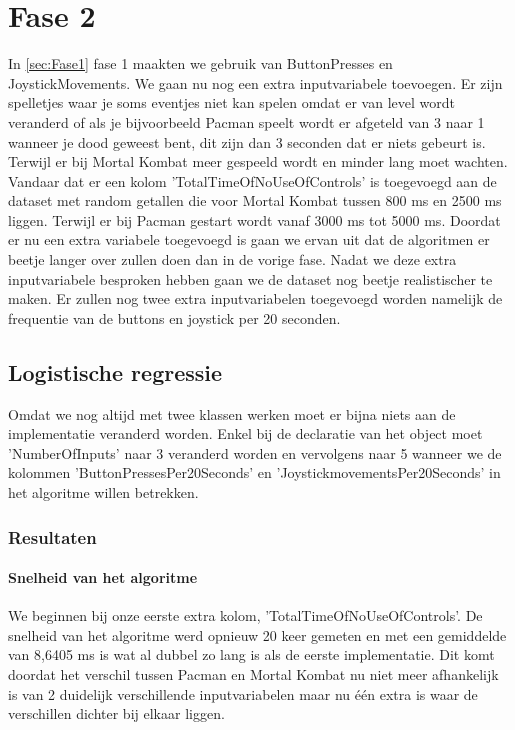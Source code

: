 
\newpage
\section{Fase 2}
\label{sec:Fase2}

In \ref{sec:Fase1} fase 1 maakten we gebruik van ButtonPresses en JoystickMovements. We gaan nu nog een extra inputvariabele toevoegen. Er zijn spelletjes waar je soms eventjes niet kan spelen omdat er van level wordt veranderd of als je bijvoorbeeld Pacman speelt wordt er afgeteld van 3 naar 1 wanneer je dood geweest bent, dit zijn dan 3 seconden dat er niets gebeurt is. Terwijl er bij Mortal Kombat meer gespeeld wordt en minder lang moet wachten.
Vandaar dat er een kolom 'TotalTimeOfNoUseOfControls' is toegevoegd aan de dataset met random getallen die voor Mortal Kombat tussen 800 ms en 2500 ms liggen. Terwijl er bij Pacman gestart wordt vanaf 3000 ms tot 5000 ms.
Doordat er nu een extra variabele toegevoegd is gaan we ervan uit dat de algoritmen er beetje langer over zullen doen dan in de vorige fase. Nadat we deze extra inputvariabele besproken hebben gaan we de dataset nog beetje realistischer te maken. Er zullen nog twee extra inputvariabelen toegevoegd worden namelijk de frequentie van de buttons en joystick per 20 seconden.  

\subsection{Logistische regressie}
\label{sec:Logistischeregressie-fase2}

Omdat we nog altijd met twee klassen werken moet er bijna niets aan de implementatie veranderd worden. Enkel bij de declaratie van het object moet 'NumberOfInputs' naar 3 veranderd worden en vervolgens naar 5 wanneer we de kolommen 'ButtonPressesPer20Seconds' en 'JoystickmovementsPer20Seconds' in het algoritme willen betrekken. 

\subsubsection{Resultaten}
\paragraph{Snelheid van het algoritme} 
We beginnen bij onze eerste extra kolom, 'TotalTimeOfNoUseOfControls'. De snelheid van het algoritme werd opnieuw 20 keer gemeten en met een gemiddelde van 8,6405 ms is wat al  dubbel zo lang is als de eerste implementatie. Dit komt doordat het verschil tussen Pacman en Mortal Kombat nu niet meer afhankelijk is van 2 duidelijk verschillende inputvariabelen maar nu één extra is waar de verschillen dichter bij elkaar liggen.

